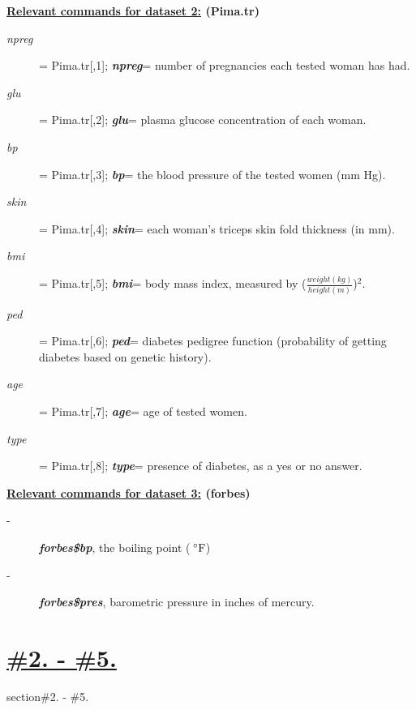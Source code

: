 \begin{center}{\textbf{\underline{Relevant commands for dataset 2:} (Pima.tr)}}\end{center}
\begin{description}

\item[\textit{npreg}]= Pima.tr[,1]; \textbf{\textit{npreg}}= number of pregnancies each tested woman has had.
\item[\textit{glu}]= Pima.tr[,2]; \textbf{\textit{glu}}= plasma glucose concentration of each woman.
\item[\textit{bp}]= Pima.tr[,3]; \textbf{\textit{bp}}= the blood pressure of the tested women (mm Hg).
\item[\textit{skin}]= Pima.tr[,4]; \textbf{\textit{skin}}= each woman's triceps skin fold thickness (in mm).
\item[\textit{bmi}]= Pima.tr[,5]; \textbf{\textit{bmi}}= body mass index, measured by {\color{MidnightBlue}($\frac{weight(kg)}{height(m)}$)\begin{math}^2\end{math}}.
\item[\textit{ped}]= Pima.tr[,6]; \textbf{\textit{ped}}= diabetes pedigree function (probability of getting diabetes based on genetic history).
\item[\textit{age}]= Pima.tr[,7]; \textbf{\textit{age}}= age of tested women.
\item[\textit{type}]= Pima.tr[,8]; \textbf{\textit{type}}= presence of diabetes, as a yes or no answer.
\end{description}
\vspace{1cm}
\begin{center}{\textbf{\underline{Relevant commands for dataset 3:} (forbes)}}\end{center}
\begin{description}

\item[-] \textbf{\textit{forbes\$bp}}, the boiling point ({$\,^{\circ}\rm{F}$})
\item[-] \textbf{\textit{forbes\$pres}}, barometric pressure in inches of mercury.
\end{description}

\tableofcontents
\label{label:BTP}

\section*{\textbf{\underline{\#2. - \#5.}}}
{section}{{\#2. - \#5.}}

